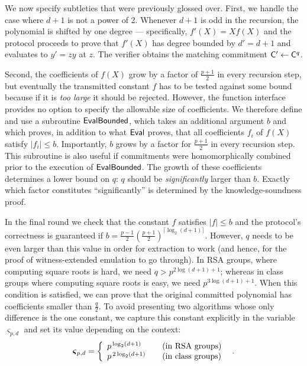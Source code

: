We now specify subtleties that were previously glossed over. 
First, we handle the case where $d+1$ is not a power of 2.  Whenever $d+1$ is odd in the recursion, the polynomial is shifted by one degree --- specifically, $f'(X) = X f(X)$ and the protocol proceeds to prove that $f'(X)$ has degree bounded by $d' = d+1$ and evaluates to $y' = zy$ at $z$. The verifier obtains the matching commitment $\mathsf{C}'\gets\mathsf{C}^q$.

Second, the coefficients of $f(X)$ grow by a factor of $\frac{p+1}{2}$ in every recursion step, but eventually the transmitted constant $f$ has to be tested against some bound because if it is \emph{too large} it should be rejected. However, the function interface provides no option to specify the allowable size of coefficients. We therefore define and use a subroutine $\textsf{{EvalBounded}}$, which takes an additional argument $b$ and which proves, in addition to what $\textsf{{Eval}}$ proves, that all coefficients $f_i$ of $f(X)$ satisfy $|f_i| \leq b$. Importantly, $b$ grows by a factor for $\frac{p+1}{2}$ in every recursion step. This subroutine is also useful if commitments were homomorphically combined prior to the execution of $\textsf{{EvalBounded}}$. The growth of these coefficients determines a lower bound on $q$: $q$ should be \emph{significantly} larger than $b$. Exactly which factor constitutes ``significantly'' is determined by the knowledge-soundness proof.

In the final round we check that the constant $f$ satisfies $|f|\leq b$ and the protocol's correctness is guaranteed if $b = \frac{p-1}{2}(\frac{p+1}{2})^{\lceil\log_2(d+1)\rceil}$. However, $q$ needs to be even larger than this value in order for extraction to work (and hence, for the proof of witness-extended emulation to go through). In RSA groups, where computing square roots is hard, we need $q>p^{2\log(d+1)+1}$; whereas in class groups where computing square roots is easy, we need $p^{3\log(d+1)+1}$. When this condition is satisfied, we can prove that the original committed polynomial has coefficients smaller than $\frac{q}{2}$. To avoid presenting two algorithms whose only difference is the one constant, we capture this constant explicitly in the variable $\boldsymbol{\varsigma}_{p,d}$ and set its value depending on the context:
\[
    \boldsymbol{\varsigma}_{p, d} = \left\{
        \begin{array}{ll}
            p^{\,\log_2(d+1)} & \quad \textnormal{(in RSA groups)} \\
            p^{\,2\log_2(d+1)} & \quad \textnormal{(in class groups)}
        \end{array}
    \right. \enspace .
\]

